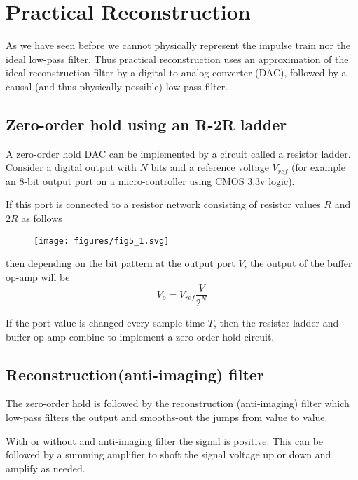 \documentclass{article}
\begin{document}
\section{Practical Reconstruction}

As we have seen before we cannot physically represent the impulse train nor the ideal low-pass filter. Thus practical reconstruction uses an approximation of the ideal reconstruction filter by a digital-to-analog converter (DAC), followed by a causal (and thus physically possible) low-pass filter.

\subsection{Zero-order hold using an R-2R ladder}

A zero-order hold DAC can be implemented by a circuit called a resistor ladder. Consider a digital output with $N$ bits and a reference voltage $V_{ref}$ (for example an 8-bit output port on a micro-controller using CMOS 3.3v logic).

If this port is connected to a resistor network consisting of resistor values $R$ and $2R$ as follows

\begin{figure}
  \centering
  \texttt{[image: figures/fig5\_1.svg]}
\end{figure}

then depending on the bit pattern at the output port $V$, the output of the buffer op-amp will be
\[
V_o = V_{ref}\frac{V}{2^N}
\]

If the port value is changed every sample time $T$, then the resister ladder and buffer op-amp combine to implement a zero-order hold circuit.

\subsection{Reconstruction(anti-imaging) filter}

The zero-order hold is followed by the reconstruction (anti-imaging) filter which low-pass filters the output and smooths-out the jumps from value to value.

With or without and anti-imaging filter the signal is positive. This can be followed by a summing amplifier to shoft the signal voltage up or down and amplify as needed.
\end{document}

